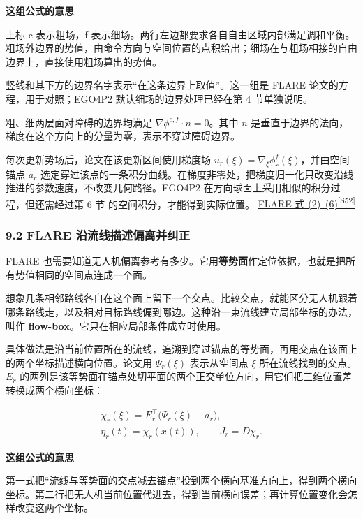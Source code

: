 \documentclass[12pt,a4paper]{article}
\numberwithin{equation}{topic}
\newcommand{\sourceref}[2]{\hyperlink{source-#1}{#2\textsuperscript{[#1]}}}
\begin{document}
\noindent\textbf{这组公式的意思}\par\nobreak
上标 c 表示粗场，f 表示细场。两行左边都要求各自自由区域内部满足调和平衡。粗场外边界的势值，由命令方向与空间位置的点积给出；细场在与粗场相接的自由边界上，直接使用粗场算出的势值。

竖线和其下方的边界名字表示“在这条边界上取值”。这一组是 FLARE 论文的方程，用于对照；EGO4P2 默认细场的边界处理已经在第 4 节单独说明。


粗、细两层面对障碍的边界均满足 \(\nabla\phi^{c,f}\cdot n=0\)。其中 \(n\) 是垂直于边界的法向，梯度在这个方向上的分量为零，表示不穿过障碍边界。

每次更新势场后，论文在该更新区间使用梯度场 \(u_r(\xi)=\nabla_\xi\phi_r^f(\xi)\)，并由空间锚点 \(a_r\) 选定穿过该点的一条积分曲线。在梯度非零处，把梯度归一化只改变沿线推进的参数速度，不改变几何路径。EGO4P2 在方向球面上采用相似的积分过程，但还需经过第 6 节 的空间积分，才能得到实际位置。 \sourceref{S52}{FLARE 式 (2)–(6)}

\subsubsection*{9.2 FLARE 沿流线描述偏离并纠正}

FLARE 也需要知道无人机偏离参考有多少。它用\textbf{等势面}作定位依据，也就是把所有势值相同的空间点连成一个面。

想象几条相邻路线各自在这个面上留下一个交点。比较交点，就能区分无人机跟着哪条路线走，以及相对目标路线偏到哪边。这种沿一束流线建立局部坐标的办法，叫作 \textbf{flow-box}。它只在相应局部条件成立时使用。

具体做法是沿当前位置所在的流线，追溯到穿过锚点的等势面，再用交点在该面上的两个坐标描述横向位置。论文用 \(\Psi_r(\xi)\) 表示从空间点 \(\xi\) 所在流线找到的交点。\(E_r\) 的两列是该等势面在锚点处切平面的两个正交单位方向，用它们把三维位置差转换成两个横向坐标：

\begin{equation}
\label{eq:flow-box}
\begin{gathered}
\chi_r(\xi)=E_r^\top\bigl(\Psi_r(\xi)-a_r\bigr),\qquad\\
\eta_r(t)=\chi_r(x(t)),\qquad J_r=D\chi_r.
\end{gathered}
\end{equation}

\noindent\textbf{这组公式的意思}\par\nobreak
第一式把“流线与等势面的交点减去锚点”投到两个横向基准方向上，得到两个横向坐标。第二行把无人机当前位置代进去，得到当前横向误差；再计算位置变化会怎样改变这两个坐标。
\end{document}
